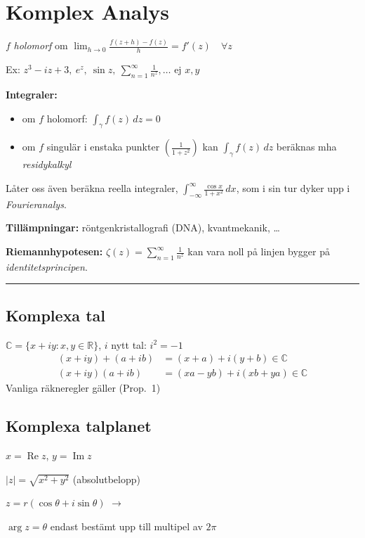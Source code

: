 \section{Komplex Analys}
\hfill {}

$f$ \emph{holomorf} om $\displaystyle\lim_{h \to 0} \frac{f(z+h) - f(z)}{h} = f'(z) \quad \forall z$

Ex: $z^3 - iz + 3,\ e^z,\ \sin z,\ \sum_{n=1}^{\infty} \frac{1}{n^z}, \dots$ \qquad ej $x, y$

\textbf{Integraler:}
\begin{itemize}
  \item om $f$ holomorf: $\int_\gamma f(z)\,dz = 0$
  \item om $f$ singulär i enstaka punkter $\left(\frac{1}{1+z^2}\right)$ kan $\int_\gamma f(z)\,dz$ beräknas mha \emph{residykalkyl}
\end{itemize}
Låter oss även beräkna reella integraler, $\displaystyle\int_{-\infty}^{\infty} \frac{\cos x}{1+x^2}\,dx$, som i sin tur dyker upp i \emph{Fourieranalys}.

\textbf{Tillämpningar:} röntgenkristallografi (DNA), kvantmekanik, \dots

\textbf{Riemannhypotesen:} $\zeta(z) = \sum_{n=1}^{\infty} \frac{1}{n^z}$ kan vara noll på linjen
bygger på \emph{identitetsprincipen}.

\noindent\rule{\linewidth}{0.4pt}

\subsection{Komplexa tal}
$\mathbb{C} = \{x + iy : x, y \in \mathbb{R}\}$, \quad $i$ nytt tal: $i^2 = -1$
\begin{align*}
  (x+iy) + (a+ib) &= (x+a) + i(y+b) \in \mathbb{C} \\
  (x+iy)(a+ib) &= (xa - yb) + i(xb + ya) \in \mathbb{C}
\end{align*}
Vanliga räkneregler gäller (Prop.\ 1)

\subsection{Komplexa talplanet}
$x = \operatorname{Re} z$, \quad $y = \operatorname{Im} z$

$|z| = \sqrt{x^2 + y^2}$ \quad (absolutbelopp)


\begin{framed}
$z = r(\cos\theta + i\sin\theta)$ \quad $\rightarrow$

$\arg z = \theta$ endast bestämt upp till multipel av $2\pi$
\end{framed}
